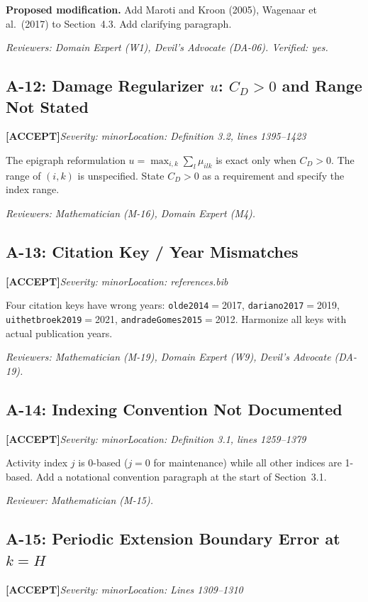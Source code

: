 \documentclass[11pt,a4paper]{article}
\newcommand{\acceptlabel}{\textbf{\textcolor{acceptgreen}{[ACCEPT]}}}
\begin{document}
\textbf{Proposed modification.} Add Maroti and Kroon (2005), Wagenaar et al.\ (2017) to Section~4.3. Add clarifying paragraph.

\textit{Reviewers: Domain Expert (W1), Devil's Advocate (DA-06). Verified: yes.}

\bigskip


\subsection{A-12: Damage Regularizer $u$: $C_D>0$ and Range Not Stated}
\acceptlabel\quad\textit{Severity: minor}\quad\textit{Location: Definition 3.2, lines 1395--1423}

The epigraph reformulation $u=\max_{i,k}\sum_l\mu_{ilk}$ is exact only when $C_D>0$. The range of $(i,k)$ is unspecified. State $C_D>0$ as a requirement and specify the index range.

\textit{Reviewers: Mathematician (M-16), Domain Expert (M4).}

\subsection{A-13: Citation Key / Year Mismatches}
\acceptlabel\quad\textit{Severity: minor}\quad\textit{Location: references.bib}

Four citation keys have wrong years: \texttt{olde2014}$=$2017, \texttt{dariano2017}$=$2019, \texttt{uithetbroek2019}$=$2021, \texttt{andradeGomes2015}$=$2012. Harmonize all keys with actual publication years.

\textit{Reviewers: Mathematician (M-19), Domain Expert (W9), Devil's Advocate (DA-19).}

\subsection{A-14: Indexing Convention Not Documented}
\acceptlabel\quad\textit{Severity: minor}\quad\textit{Location: Definition 3.1, lines 1259--1379}

Activity index $j$ is 0-based ($j=0$ for maintenance) while all other indices are 1-based. Add a notational convention paragraph at the start of Section~3.1.

\textit{Reviewer: Mathematician (M-15).}

\subsection{A-15: Periodic Extension Boundary Error at $k=H$}
\acceptlabel\quad\textit{Severity: minor}\quad\textit{Location: Lines 1309--1310}
\end{document}

